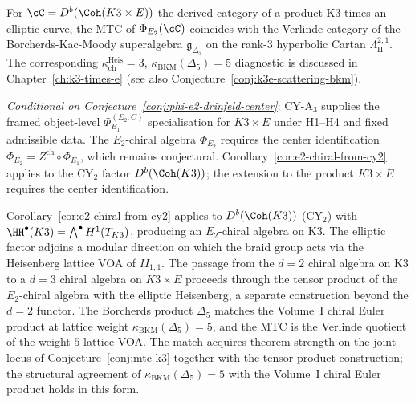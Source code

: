 \begin{conjecture}
\label{conj:mtc-k3}
\ClaimStatusConjectured
For $\cC = D^b(\Coh(K3 \times E))$ the derived category of a product
K3 times an elliptic curve, the MTC of $\Phi_{E_2}(\cC)$ coincides
with the Verlinde category of the Borcherds-Kac-Moody superalgebra
$\mathfrak{g}_{\Delta_5}$ on the rank-$3$ hyperbolic Cartan
$\Lambda^{2,1}_{\mathrm{II}}$. The
corresponding $\kappa_{\mathrm{ch}}^{\mathrm{Heis}} = 3$, $\kappa_{\mathrm{BKM}}(\Delta_5) = 5$
diagnostic is discussed in
Chapter~\ref{ch:k3-times-e} (see also Conjecture~\ref{conj:k3e-scattering-bkm}).

\emph{Conditional on Conjecture~\textup{\ref{conj:phi-e2-drinfeld-center}}}:
CY-A$_3$ supplies the framed object-level $\Phi_{E_1}^{(\Sigma_2,C)}$
specialisation for $K3 \times E$ under H1--H4 and fixed admissible data. The $E_2$-chiral algebra $\Phi_{E_2}$
requires the center identification
$\Phi_{E_2} = Z^{\mathrm{ch}} \circ \Phi_{E_1}$, which remains conjectural.
Corollary~\textup{\ref{cor:e2-chiral-from-cy2}} applies
to the CY$_2$ factor $D^b(\Coh(K3))$; the extension to the product
$K3 \times E$ requires the center identification.
\end{conjecture}

\begin{remark}[Evidence]
\label{rem:mtc-k3-evidence}
Corollary~\ref{cor:e2-chiral-from-cy2} applies to $D^b(\Coh(K3))$
(CY$_2$) with $\HH^\bullet(K3) = \bigwedge^\bullet H^1(T_{K3})$,
producing an $E_2$-chiral algebra on K3. The elliptic factor adjoins
a modular direction on which the braid group acts via the Heisenberg
lattice VOA of $II_{1, 1}$. The passage from the $d = 2$ chiral
algebra on K3 to a $d = 3$ chiral algebra on $K3 \times E$ proceeds
through the tensor product of the $E_2$-chiral algebra with the
elliptic Heisenberg, a separate construction beyond the $d = 2$
functor. The Borcherds product $\Delta_5$ matches the Volume~I chiral
Euler product at lattice weight $\kappa_{\mathrm{BKM}}(\Delta_5) = 5$, and the
MTC is the Verlinde quotient of the weight-$5$ lattice VOA. The match
acquires theorem-strength on the joint locus of
Conjecture~\ref{conj:mtc-k3} together with the tensor-product
construction; the structural agreement of $\kappa_{\mathrm{BKM}}(\Delta_5) = 5$
with the Volume~I chiral Euler product holds in this form.
\end{remark}

